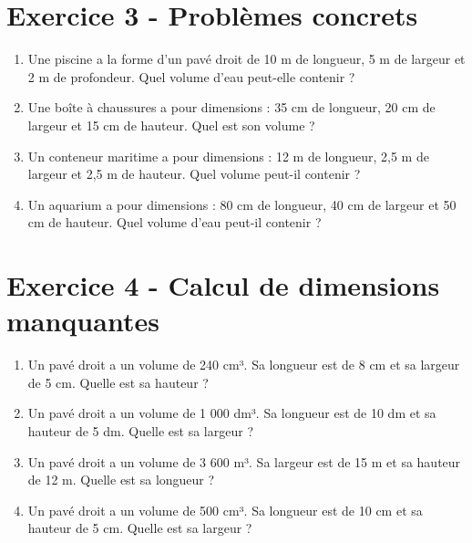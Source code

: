 \documentclass[12pt, a4paper]{article}
\begin{document}
\section*{Exercice 3 - Problèmes concrets}
\begin{enumerate}[label=\textbf{\arabic*.}]
    \item Une piscine a la forme d'un pavé droit de 10 m de longueur, 5 m de largeur et 2 m de profondeur. Quel volume d'eau peut-elle contenir ?
    \item Une boîte à chaussures a pour dimensions : 35 cm de longueur, 20 cm de largeur et 15 cm de hauteur. Quel est son volume ?
    \item Un conteneur maritime a pour dimensions : 12 m de longueur, 2,5 m de largeur et 2,5 m de hauteur. Quel volume peut-il contenir ?
    \item Un aquarium a pour dimensions : 80 cm de longueur, 40 cm de largeur et 50 cm de hauteur. Quel volume d'eau peut-il contenir ?
\end{enumerate}

\section*{Exercice 4 - Calcul de dimensions manquantes}
\begin{enumerate}[label=\textbf{\arabic*.}]
    \item Un pavé droit a un volume de 240 cm³. Sa longueur est de 8 cm et sa largeur de 5 cm. Quelle est sa hauteur ?
    \item Un pavé droit a un volume de 1 000 dm³. Sa longueur est de 10 dm et sa hauteur de 5 dm. Quelle est sa largeur ?
    \item Un pavé droit a un volume de 3 600 m³. Sa largeur est de 15 m et sa hauteur de 12 m. Quelle est sa longueur ?
    \item Un pavé droit a un volume de 500 cm³. Sa longueur est de 10 cm et sa hauteur de 5 cm. Quelle est sa largeur ?
\end{enumerate}
\end{document}
